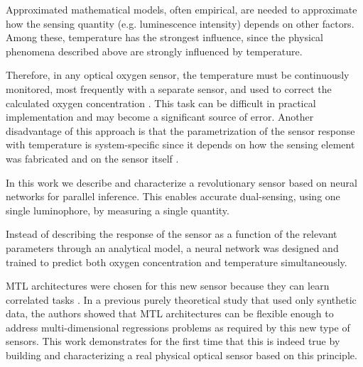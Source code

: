 \documentclass[sensors,article,submit,moreauthors,pdftex,10pt,a4paper]{Definitions/mdpi}
\begin{document}
Approximated mathematical models, often empirical, are needed to approximate how the sensing quantity (e.g. luminescence intensity) depends on other factors. Among these, temperature has the strongest influence, since the physical phenomena described above are strongly influenced by temperature.



Therefore, in any optical oxygen sensor, the temperature must be continuously monitored, most frequently with a separate sensor, and used to correct the calculated oxygen concentration \cite{Li2015}. This task can be difficult in practical implementation and may become a significant source of error.%
Another disadvantage of this approach is that the parametrization of the sensor response with temperature is system-specific since it depends  on how the sensing element was fabricated and on the sensor itself \cite{Xu1994,Draxler1995,Hartmann1996,Mills1998,Badocco2008,Dini2011}.

In this work we describe and characterize a revolutionary sensor based on neural networks for parallel inference. This enables  accurate dual-sensing, using one single luminophore, by measuring a single quantity.

Instead of describing the response of the sensor as a function of the relevant parameters through an analytical model, a neural network  was designed and trained to predict both oxygen concentration and temperature simultaneously.


MTL architectures were chosen for this new sensor because they can learn correlated tasks \cite{Argyriou2006, Thrun1996, Caruana1997, Zhang2017, Baxter2000, Thung2018}. In a previous purely theoretical study that used only synthetic data, the authors showed that MTL architectures can be flexible enough to address multi-dimensional regressions problems \cite{Michelucci2019_2} as required by this new type of sensors. This work demonstrates for the first time that this is indeed true by building and characterizing a real physical optical sensor based on this principle.
\end{document}
